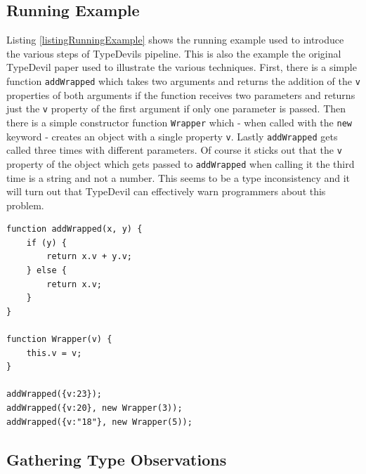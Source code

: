 \documentclass[runningheads,a4paper]{llncs}
\begin{document}
\subsection{Running Example}
Listing \ref{listingRunningExample} shows the running example used to introduce the various steps of TypeDevils pipeline.
This is also the example the original TypeDevil paper used to illustrate the various techniques.
First, there is a simple function \lstinline[columns=fixed]{addWrapped} which takes two arguments and returns the addition of the \lstinline[columns=fixed]{v} properties of both arguments if the function receives two parameters and returns just the \lstinline[columns=fixed]{v} property of the first argument if only one parameter is passed.
Then there is a simple constructor function \lstinline[columns=fixed]{Wrapper} which - when called with the \lstinline[columns=fixed]{new} keyword - creates an object with a single property \lstinline[columns=fixed]{v}.
Lastly \lstinline[columns=fixed]{addWrapped} gets called three times with different parameters.
Of course it sticks out that the \lstinline[columns=fixed]{v} property of the object which gets passed to \lstinline[columns=fixed]{addWrapped} when calling it the third time is a string and not a number.
This seems to be a type inconsistency and it will turn out that TypeDevil can effectively warn programmers about this problem.

\medskip\medskip
\lstset{language=javascript}
\begin{minipage}{\linewidth}
\begin{lstlisting}[frame=single, caption=Running Example, label=listingRunningExample]
function addWrapped(x, y) {
    if (y) {
        return x.v + y.v;
    } else {
        return x.v;
    }
}

function Wrapper(v) {
    this.v = v;
}

addWrapped({v:23});
addWrapped({v:20}, new Wrapper(3));
addWrapped({v:"18"}, new Wrapper(5));
\end{lstlisting}
\end{minipage}


\subsection{Gathering Type Observations}
\end{document}
